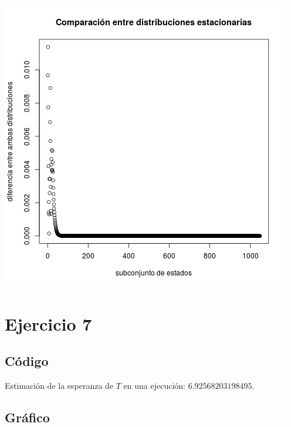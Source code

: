 \documentclass[paper=letter, fontsize=12pt]{scrartcl} %
\numberwithin{equation}{section} %
\numberwithin{figure}{section} %
\numberwithin{table}{section} %
\begin{document}
\begin{center}
  \includegraphics[scale=0.5]{ej6_4.png}
\end{center}

\newpage

\section{Ejercicio 7}

\subsection{Código}


\par \par
Estimación de la esperanza de $T$ en una ejecución: $6{.}92568203198495$.

\subsection{Gráfico}
\end{document}
